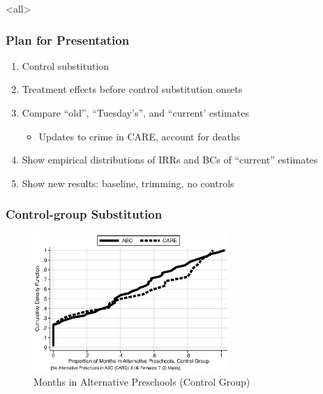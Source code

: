 \documentclass[static]{JJH-Beamer}
\begin{document}
\renewcommand*{\inserttotalframenumber}{\pageref{lastframe}}
\mode<all>{\theTitlePages} %



\begin{frame}
\frametitle{Plan for Presentation}
\begin{enumerate}
	\item Control substitution
	\item Treatment effects before control substitution onsets
	\item Compare ``old'', ``Tuesday's'', and ``current'  estimates
		\begin{itemize}
				\item Updates to crime in CARE, account for deaths 
		\end{itemize}
	\item Show empirical distributions of IRRs and BCs of ``current'' estimates
	\item Show new results: baseline, trimming, no controls
\end{enumerate}
\end{frame}


\begin{frame}
\frametitle{Control-group Substitution}\label{substitution}
\begin{figure}
\caption{Months in Alternative Preschools (Control Group)}
	\includegraphics[width=20em]{output/abccare_controlcontamination.eps}
\end{figure}
\hyperlink{abc_subsidized}{}
\hyperlink{care_subsidized}{}
\end{frame}
\end{document}
